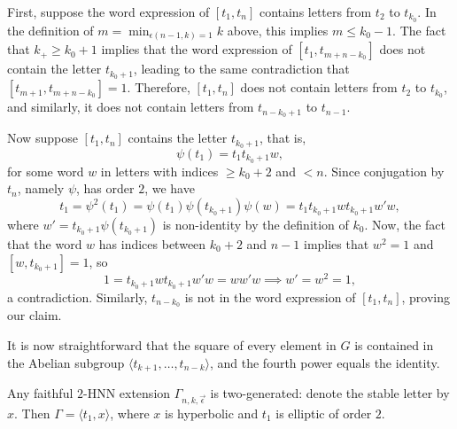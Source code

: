 \documentclass[12pt,leqno]{amsart}
\makeatletter
\renewenvironment{proof}[1][\proofname]{%
	\par
	\pushQED{\qed}%
	\normalfont
	\topsep6\p@\@plus6\p@\relax
	\trivlist
	\item[\hskip\labelsep\itshape #1\@addpunct{.}]%
	\ignorespaces
}{%
	\par\nobreak\vspace{2pt}%
	\popQED%
	\medskip%
	\endtrivlist
	\@endpefalse
}
\newcommand{\2}{L^2_{\rm per}(0, T)}
\numberwithin{equation}{section}
\numberwithin{figure}{section}
\makeatother
\begin{document}
\begin{proof}[Proof of Theorem \ref{thm:HNN_rigidity}]
    First, suppose the word expression of $[t_1,t_n]$ contains letters from $t_2$ to $t_{k_0}$. In the definition of $m = \min_{\epsilon(n-1,k) = 1} k$ above, this implies $m\leq k_0 - 1$. The fact that $k_+\geq k_0+1$ implies that the word expression of $[t_1,t_{m+n-k_0}]$ does not contain the letter $t_{k_0+1}$, leading to the same contradiction that $[t_{m+1},t_{m+n-k_0}] = 1$. Therefore, $[t_1,t_n]$ does not contain letters from $t_2$ to $t_{k_0}$, and similarly, it does not contain letters from $t_{n-k_0+1}$ to $t_{n-1}$.
    
    Now suppose $[t_1,t_n]$ contains the letter $t_{k_0+1}$, that is,
    \[
        \psi(t_1) = t_1t_{k_0+1}w,
    \]
    for some word $w$ in letters with indices $\geq k_0+2$ and $<n$. Since conjugation by $t_n$, namely $\psi$, has order $2$, we have
    \[
        t_1 = \psi^2(t_1) = \psi(t_1)\psi(t_{k_0+1})\psi(w) = t_1t_{k_0+1}wt_{k_0+1}w'w,
    \]
    where $w' = t_{k_0+1}\psi(t_{k_0+1})$ is non-identity by the definition of $k_0$. Now, the fact that the word $w$ has indices between $k_0+2$ and $n-1$ implies that $w^2 = 1$ and $[w,t_{k_0+1}] = 1$, so
    \[
        1 = t_{k_0+1}wt_{k_0+1}w'w = ww'w\implies w' = w^2 = 1,
    \]
    a contradiction. Similarly, $t_{n-k_0}$ is not in the word expression of $[t_1,t_n]$, proving our claim.
    
    It is now straightforward that the square of every element in $G$ is contained in the Abelian subgroup $\langle t_{k+1},\dots, t_{n-k}\rangle$, and the fourth power equals the identity.
\end{proof}
Any faithful $2$-HNN extension $\Gamma_{n,k,\vec{\epsilon}}$ is two-generated: denote the stable letter by $x$. Then $\Gamma = \langle t_1, x\rangle$, where $x$ is hyperbolic and $t_1$ is elliptic of order $2$.
\end{document}
